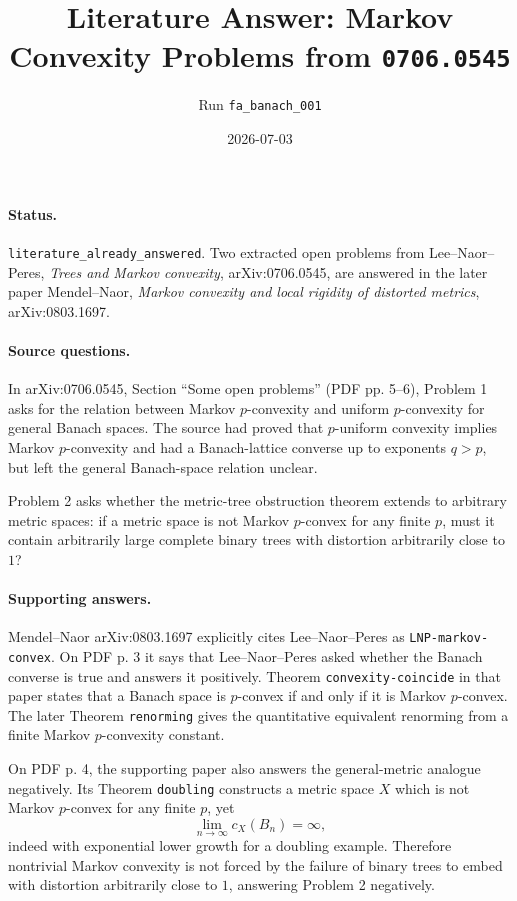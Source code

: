 \documentclass[11pt]{article}
\title{Literature Answer: Markov Convexity Problems from \texttt{0706.0545}}
\author{Run \texttt{fa\_banach\_001}}
\date{2026-07-03}
\begin{document}
\maketitle

\paragraph{Status.}
\texttt{literature\_already\_answered}.  Two extracted open problems from
Lee--Naor--Peres, \emph{Trees and Markov convexity}, arXiv:0706.0545, are
answered in the later paper Mendel--Naor, \emph{Markov convexity and local
rigidity of distorted metrics}, arXiv:0803.1697.

\paragraph{Source questions.}
In arXiv:0706.0545, Section ``Some open problems'' (PDF pp. 5--6),
Problem 1 asks for the relation between Markov \(p\)-convexity and uniform
\(p\)-convexity for general Banach spaces.  The source had proved that
\(p\)-uniform convexity implies Markov \(p\)-convexity and had a Banach-lattice
converse up to exponents \(q>p\), but left the general Banach-space relation
unclear.

Problem 2 asks whether the metric-tree obstruction theorem extends to arbitrary
metric spaces: if a metric space is not Markov \(p\)-convex for any finite
\(p\), must it contain arbitrarily large complete binary trees with distortion
arbitrarily close to \(1\)?

\paragraph{Supporting answers.}
Mendel--Naor arXiv:0803.1697 explicitly cites Lee--Naor--Peres as
\texttt{LNP-markov-convex}.  On PDF p. 3 it says that Lee--Naor--Peres asked
whether the Banach converse is true and answers it positively.  Theorem
\texttt{convexity-coincide} in that paper states that a Banach space is
\(p\)-convex if and only if it is Markov \(p\)-convex.  The later Theorem
\texttt{renorming} gives the quantitative equivalent renorming from a
finite Markov \(p\)-convexity constant.

On PDF p. 4, the supporting paper also answers the general-metric analogue
negatively.  Its Theorem \texttt{doubling} constructs a metric space
\(X\) which is not Markov \(p\)-convex for any finite \(p\), yet
\[
  \lim_{n\to\infty} c_X(B_n)=\infty,
\]
indeed with exponential lower growth for a doubling example.  Therefore
nontrivial Markov convexity is not forced by the failure of binary trees to
embed with distortion arbitrarily close to \(1\), answering Problem 2
negatively.
\end{document}

